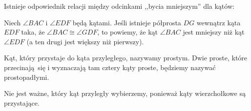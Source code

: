 Istnieje odpowiednik relacji między odcinkami ,,bycia mniejszym'' dla kątów:

\begin{definition}
    Niech $\angle BAC$ i $\angle EDF$ będą kątami.
    Jeśli istnieje półprosta $DG$ wewnątrz kąta $EDF$ taka, że $\angle BAC \cong \angle GDF$, to powiemy, że kąt $\angle BAC$ jest mniejszy niż kąt $\angle EDF$ (a ten drugi jest większy niż pierwszy).
\end{definition}

\begin{definition}
    Kąt, który przystaje do kąta przyległego, nazywamy prostym.
    Dwie proste, które przecinają się i wyznaczają tam cztery kąty proste, będziemy nazywać prostopadłymi.
\end{definition}

Nie jest ważne, który kąt przyległy wybierzemy, ponieważ kąty wierzchołkowe są przystające.
